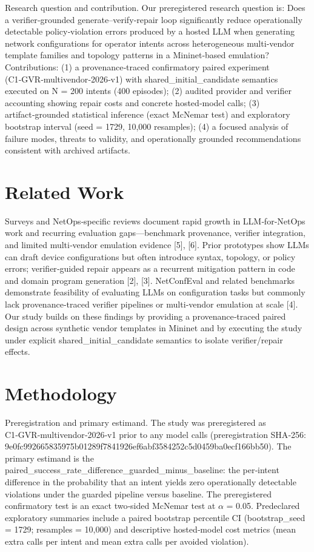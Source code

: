 \documentclass[conference]{IEEEtran}
\begin{document}
Research question and contribution. Our preregistered research question is: Does a verifier‑grounded generate--verify‑repair loop significantly reduce operationally detectable policy‑violation errors produced by a hosted LLM when generating network configurations for operator intents across heterogeneous multi‑vendor template families and topology patterns in a Mininet‑based emulation? Contributions: (1) a provenance‑traced confirmatory paired experiment (C1‑GVR‑multivendor‑2026‑v1) with shared\_initial\_candidate semantics executed on N = 200 intents (400 episodes); (2) audited provider and verifier accounting showing repair costs and concrete hosted‑model calls; (3) artifact‑grounded statistical inference (exact McNemar test) and exploratory bootstrap interval (seed = 1729, 10,000 resamples); (4) a focused analysis of failure modes, threats to validity, and operationally grounded recommendations consistent with archived artifacts.

\section{Related Work}
Surveys and NetOps‑specific reviews document rapid growth in LLM‑for‑NetOps work and recurring evaluation gaps---benchmark provenance, verifier integration, and limited multi‑vendor emulation evidence [5], [6]. Prior prototypes show LLMs can draft device configurations but often introduce syntax, topology, or policy errors; verifier‑guided repair appears as a recurrent mitigation pattern in code and domain program generation [2], [3]. NetConfEval and related benchmarks demonstrate feasibility of evaluating LLMs on configuration tasks but commonly lack provenance‑traced verifier pipelines or multi‑vendor emulation at scale [4]. Our study builds on these findings by providing a provenance‑traced paired design across synthetic vendor templates in Mininet and by executing the study under explicit shared\_initial\_candidate semantics to isolate verifier/repair effects.

\section{Methodology}
Preregistration and primary estimand. The study was preregistered as C1‑GVR‑multivendor‑2026‑v1 prior to any model calls (preregistration SHA‑256: 9e0fc992\allowbreak{}66583597\allowbreak{}5b01289f\allowbreak{}7841926e\allowbreak{}f6abf358\allowbreak{}4252c5d0\allowbreak{}459ba0ec\allowbreak{}f166bb50). The primary estimand is the paired\_success\_rate\_difference\_guarded\_minus\_baseline: the per‑intent difference in the probability that an intent yields zero operationally detectable violations under the guarded pipeline versus baseline. The preregistered confirmatory test is an exact two‑sided McNemar test at \ensuremath{\alpha} = 0.05. Predeclared exploratory summaries include a paired bootstrap percentile CI (bootstrap\_seed = 1729; resamples = 10,000) and descriptive hosted‑model cost metrics (mean extra calls per intent and mean extra calls per avoided violation).
\end{document}

